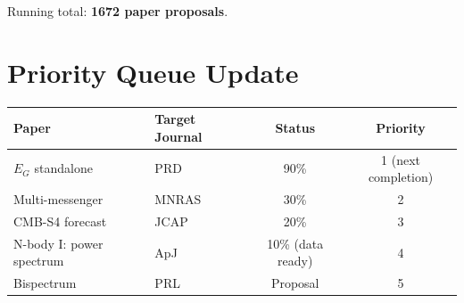 \documentclass[11pt,a4paper]{article}
\begin{document}
Running total: \textbf{1672 paper proposals}.

\section{Priority Queue Update}

\begin{center}
\begin{tabular}{llcc}
\toprule
\textbf{Paper} & \textbf{Target Journal} & \textbf{Status} & \textbf{Priority} \\
\midrule
$E_G$ standalone & PRD & 90\% & 1 (next completion) \\
Multi-messenger & MNRAS & 30\% & 2 \\
CMB-S4 forecast & JCAP & 20\% & 3 \\
N-body I: power spectrum & ApJ & 10\% (data ready) & 4 \\
Bispectrum & PRL & Proposal & 5 \\
\bottomrule
\end{tabular}
\end{center}
\end{document}
